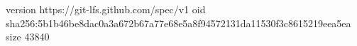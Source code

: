 version https://git-lfs.github.com/spec/v1
oid sha256:5b1b46be8dac0a3a672b67a77e68e5a8f94572131da11530f3c8615219eea5ea
size 43840

